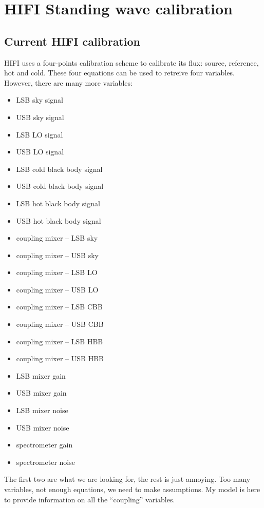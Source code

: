 \cleardoublepage
\chapter{HIFI Standing wave calibration}
\section{Current HIFI calibration}

HIFI uses a four-points calibration scheme to calibrate its flux: source, reference, hot and cold.
These four equations can be used to retreive four variables.
However, there are many more variables:
\begin{itemize}
    \item LSB sky signal
    \item USB sky signal
    \item LSB LO signal
    \item USB LO signal
    \item LSB cold black body signal
    \item USB cold black body signal
    \item LSB hot black body signal
    \item USB hot black body signal
    \item coupling mixer -- LSB sky
    \item coupling mixer -- USB sky
    \item coupling mixer -- LSB LO
    \item coupling mixer -- USB LO
    \item coupling mixer -- LSB CBB
    \item coupling mixer -- USB CBB
    \item coupling mixer -- LSB HBB
    \item coupling mixer -- USB HBB
    \item LSB mixer gain
    \item USB mixer gain
    \item LSB mixer noise
    \item USB mixer noise
    \item spectrometer gain
    \item spectrometer noise
\end{itemize}
The first two are what we are looking for, the rest is just annoying.
Too many variables, not enough equations, we need to make assumptions.
My model is here to provide information on all the ``coupling'' variables.

